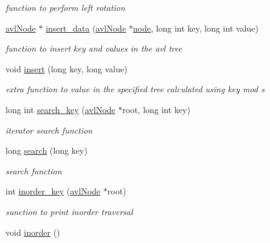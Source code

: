 \begin{DoxyCompactItemize}
\begin{DoxyCompactList}\small\item\em function to perform left rotation \end{DoxyCompactList}\item 
\hyperlink{namespace_a_v_lhash_a09cd9142193c004fe02c59c9dbc29732}{avl\-Node} $\ast$ \hyperlink{class_a_v_lhash_1_1avl_tree_a43e348f4e35f4ce321349419b806e805}{insert\-\_\-data} (\hyperlink{namespace_a_v_lhash_a09cd9142193c004fe02c59c9dbc29732}{avl\-Node} $\ast$\hyperlink{class_a_v_lhash_1_1node}{node}, long int key, long int value)
\begin{DoxyCompactList}\small\item\em function to insert key and values in the avl tree \end{DoxyCompactList}\item 
void \hyperlink{class_a_v_lhash_1_1avl_tree_ae255a3a450a2e8eb07a40ea58ccc1fe1}{insert} (long key, long value)
\begin{DoxyCompactList}\small\item\em extra function to value in the specified tree calculated using key mod s \end{DoxyCompactList}\item 
long int \hyperlink{class_a_v_lhash_1_1avl_tree_a8a9ae94b47689118903c58e62781b38e}{search\-\_\-key} (\hyperlink{namespace_a_v_lhash_a09cd9142193c004fe02c59c9dbc29732}{avl\-Node} $\ast$root, long int key)
\begin{DoxyCompactList}\small\item\em iterator search function \end{DoxyCompactList}\item 
long \hyperlink{class_a_v_lhash_1_1avl_tree_a2b072ac91fb50f9ef81643536dc251ff}{search} (long key)
\begin{DoxyCompactList}\small\item\em search function \end{DoxyCompactList}\item 
int \hyperlink{class_a_v_lhash_1_1avl_tree_a0e5ebd3217047e414ee61eef8c0c3dd3}{inorder\-\_\-key} (\hyperlink{namespace_a_v_lhash_a09cd9142193c004fe02c59c9dbc29732}{avl\-Node} $\ast$root)
\begin{DoxyCompactList}\small\item\em sunction to print inorder traversal \end{DoxyCompactList}\item 
void \hyperlink{class_a_v_lhash_1_1avl_tree_a00c20dc87002457d4b753cc75deb08ab}{inorder} ()

\end{DoxyCompactItemize}

